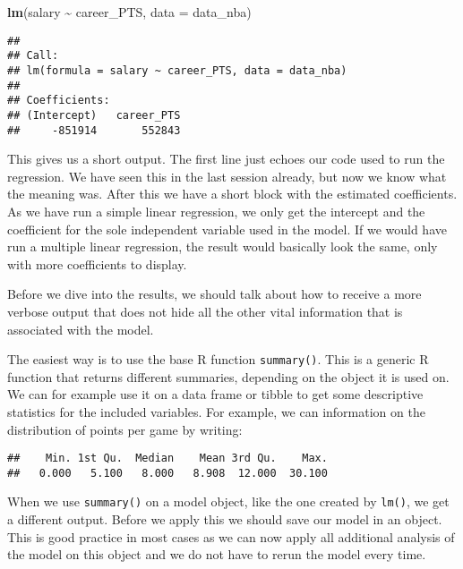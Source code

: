 \documentclass[
]{book}
\newenvironment{Shaded}{\begin{snugshade}}{\end{snugshade}}
\newcommand{\AttributeTok}[1]{\textcolor[rgb]{0.13,0.29,0.53}{#1}}
\newcommand{\FunctionTok}[1]{\textcolor[rgb]{0.13,0.29,0.53}{\textbf{#1}}}
\newcommand{\NormalTok}[1]{#1}
\newcommand{\SpecialCharTok}[1]{\textcolor[rgb]{0.81,0.36,0.00}{\textbf{#1}}}
\begin{document}
\begin{Shaded}
\begin{Highlighting}[]
\FunctionTok{lm}\NormalTok{(salary }\SpecialCharTok{\textasciitilde{}}\NormalTok{ career\_PTS, }\AttributeTok{data =}\NormalTok{ data\_nba)}
\end{Highlighting}
\end{Shaded}

\begin{verbatim}
## 
## Call:
## lm(formula = salary ~ career_PTS, data = data_nba)
## 
## Coefficients:
## (Intercept)   career_PTS  
##     -851914       552843
\end{verbatim}

This gives us a short output. The first line just echoes our code used to run
the regression. We have seen this in the last session already, but now we know
what the meaning was. After this we have a short block with the estimated
coefficients. As we have run a simple linear regression, we only get the
intercept and the coefficient for the sole independent variable used in the
model. If we would have run a multiple linear regression, the result would
basically look the same, only with more coefficients to display.

Before we dive into the results, we should talk about how to receive a more
verbose output that does not hide all the other vital information that is
associated with the model.

The easiest way is to use the base R function \texttt{summary()}. This is a generic R
function that returns different summaries, depending on the object it is used
on. We can for example use it on a data frame or tibble to get some descriptive
statistics for the included variables. For example, we can information on the
distribution of points per game by writing:

\begin{Shaded}
\end{Shaded}

\begin{verbatim}
##    Min. 1st Qu.  Median    Mean 3rd Qu.    Max. 
##   0.000   5.100   8.000   8.908  12.000  30.100
\end{verbatim}

When we use \texttt{summary()} on a model object, like the one created by \texttt{lm()}, we
get a different output. Before we apply this we should save our model in an
object. This is good practice in most cases as we can now apply all additional
analysis of the model on this object and we do not have to rerun the model
every time.
\end{document}
